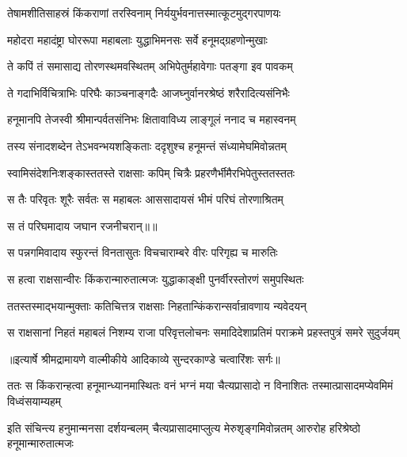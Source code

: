 \twolineshloka
{तेषामशीतिसाहस्रं किंकराणां तरस्विनाम्}
{निर्ययुर्भवनात्तस्मात्कूटमुद्गरपाणयः} %

\twolineshloka
{महोदरा महादंष्ट्रा घोररूपा महाबलाः}
{युद्धाभिमनसः सर्वे हनूमद्ग्रहणोन्मुखाः} %

\twolineshloka
{ते कपिं तं समासाद्य तोरणस्थमवस्थितम्}
{अभिपेतुर्महावेगाः पतङ्गा इव पावकम्} %

\twolineshloka
{ते गदाभिर्विचित्राभिः परिघैः काञ्चनाङ्गदैः}
{आजघ्नुर्वानरश्रेष्ठं शरैरादित्यसंनिभैः} %

\twolineshloka
{हनूमानपि तेजस्वी श्रीमान्पर्वतसंनिभः}
{क्षितावाविध्य लाङ्गूलं ननाद च महास्वनम्} %

\twolineshloka
{तस्य संनादशब्देन तेऽभवन्भयशङ्किताः}
{ददृशुश्च हनूमन्तं संध्यामेघमिवोन्नतम्} %

\twolineshloka
{स्वामिसंदेशनिःशङ्कास्ततस्ते राक्षसाः कपिम्}
{चित्रैः प्रहरणैर्भीमैरभिपेतुस्ततस्ततः} %

\twolineshloka
{स तैः परिवृतः शूरैः सर्वतः स महाबलः}
{आससादायसं भीमं परिघं तोरणाश्रितम्} %

{स तं परिघमादाय जघान रजनीचरान्॥॥} %

\addtocounter{shlokacount}{1}

\twolineshloka
{स पन्नगमिवादाय स्फुरन्तं विनतासुतः}
{विचचाराम्बरे वीरः परिगृह्य च मारुतिः} %

\twolineshloka
{स हत्वा राक्षसान्वीरः किंकरान्मारुतात्मजः}
{युद्धाकाङ्क्षी पुनर्वीरस्तोरणं समुपस्थितः} %

\twolineshloka
{ततस्तस्माद्भयान्मुक्ताः कतिचित्तत्र राक्षसाः}
{निहतान्किंकरान्सर्वान्रावणाय न्यवेदयन्} %

\fourlineindentedshloka
{स राक्षसानां निहतं महाबलं}
{ निशम्य राजा परिवृत्तलोचनः}
{समादिदेशाप्रतिमं पराक्रमे}
{ प्रहस्तपुत्रं समरे सुदुर्जयम्} %


{॥इत्यार्षे श्रीमद्रामायणे वाल्मीकीये आदिकाव्ये सुन्दरकाण्डे चत्वारिंशः सर्गः॥}


\threelineshloka
{ततः स किंकरान्हत्वा हनूमान्ध्यानमास्थितः}
{वनं भग्नं मया चैत्यप्रासादो न विनाशितः}
{तस्मात्प्रासादमप्येवमिमं विध्वंसयाम्यहम्} %

\threelineshloka
{इति संचिन्त्य हनुमान्मनसा दर्शयन्बलम्}
{चैत्यप्रासादमाप्लुत्य मेरुशृङ्गमिवोन्नतम्}
{आरुरोह हरिश्रेष्ठो हनूमान्मारुतात्मजः} %

